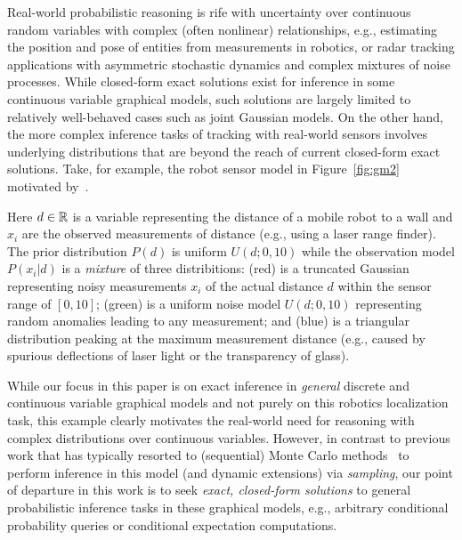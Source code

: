 \documentclass[letterpaper]{article}
\renewcommand{\-}{\text{-}}
\begin{document}
%



Real-world probabilistic reasoning is rife with uncertainty over
continuous random variables with complex (often nonlinear)
relationships, e.g., estimating the position and pose of entities from
measurements in robotics, or radar tracking applications with
asymmetric stochastic dynamics and complex mixtures of noise
processes.  While closed-form exact solutions exist for inference in
some continuous variable graphical models, such solutions are largely
limited to relatively well-behaved cases such as joint Gaussian
models.  On the other hand, the more complex inference tasks of
tracking with real-world sensors involves underlying distributions
that are beyond the reach of current closed-form exact solutions.
Take, for example, the robot sensor model in Figure~\ref{fig:gm2}
motivated by~\cite{thrun_mcl}.

Here $d \in \mathbb{R}$ is a variable representing the distance of a
mobile robot to a wall and $x_i$ are the observed measurements of
distance (e.g., using a laser range finder).  The prior distribution
$P(d)$ is uniform $U(d;0,10)$ while the observation model
$P(x_i|d)$ is a \emph{mixture} of three distribitions: (red) is a
truncated Gaussian 
representing noisy measurements $x_i$ of the actual
distance $d$ within the sensor range of $[0,10]$; 
(green) is a uniform noise model $U(d;0,10)$
representing random anomalies leading to any measurement; and
(blue) is a triangular distribution peaking at the maximum measurement
distance (e.g., caused by spurious deflections of laser light or the 
transparency of glass).

While our focus in this paper is on exact inference in \emph{general}
discrete and continuous variable graphical models and not purely on
this robotics localization task, this example clearly motivates the
real-world need for reasoning with complex distributions over
continuous variables.  However, in contrast to previous work that has
typically resorted to (sequential) Monte Carlo
methods~\cite{thrun_mcl,particle_filters} to perform inference in this
model (and dynamic extensions) via 
\emph{sampling}, our point of departure in this work is to seek \emph{exact,
closed-form solutions} to general probabilistic inference tasks in
these graphical models, e.g., arbitrary conditional probability 
queries or conditional expectation computations.
\end{document}
